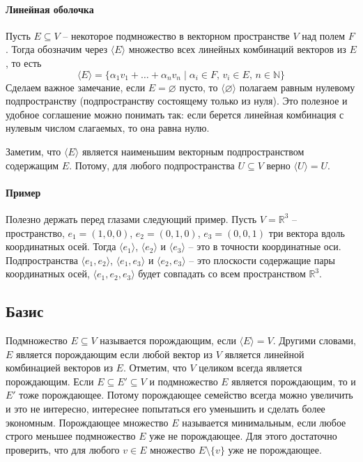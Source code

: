 \paragraph{Линейная оболочка}

Пусть $E\subseteq V$ -- некоторое подмножество в векторном пространстве $V$ над полем $F$. Тогда обозначим через $\langle E \rangle$ множество всех линейных комбинаций векторов из $E$, то есть
\[
\langle E \rangle = \{\alpha_1 v_1 + \ldots + \alpha_n v_n \mid \alpha_i\in F,\, v_i \in E,\, n\in\mathbb N\}
\]
Сделаем важное замечание, если $E = \varnothing$ пусто, то $\langle \varnothing \rangle$ полагаем равным нулевому подпространству (подпространству состоящему только из нуля). Это полезное и удобное соглашение можно понимать так: если берется линейная комбинация с нулевым числом слагаемых, то она равна нулю.

Заметим, что $\langle E \rangle$ является наименьшим векторным подпространством содержащим $E$. Потому, для любого подпространства $U\subseteq V$ верно $\langle U \rangle  = U$.


\paragraph{Пример}

Полезно держать перед глазами следующий пример. Пусть $V = \mathbb R^3$ -- пространство, $e_1 =(1,0,0)$, $e_2 = (0,1,0)$, $e_3 = (0,0,1)$ три вектора вдоль координатных осей. Тогда $\langle e_1\rangle$, $\langle e_2\rangle$ и $\langle e_3\rangle$ -- это в точности координатные оси. Подпространства $\langle e_1, e_2\rangle$, $\langle e_1, e_3\rangle$ и $\langle e_2, e_3\rangle$ -- это плоскости содержащие пары координатных осей, $\langle e_1, e_2, e_3\rangle$ будет совпадать со всем пространством $\mathbb R^3$.


\subsection{Базис}

Подмножество $E\subseteq V$ называется порождающим, если $\langle E \rangle  = V$. Другими словами, $E$ является порождающим если любой вектор из $V$ является линейной комбинацией векторов из $E$. Отметим, что $V$ целиком всегда является порождающим. Если $E\subseteq E'\subseteq V$ и подмножество $E$ является порождающим, то и $E'$ тоже порождающее. Потому порождающее семейство всегда можно увеличить и это не интересно, интереснее попытаться его уменьшить и сделать более экономным. Порождающее множество $E$ называется минимальным, если любое строго меньшее подмножество $E$ уже не порождающее. Для этого достаточно проверить, что для любого $v\in E$ множество $E\setminus \{v\}$ уже не порождающее.

